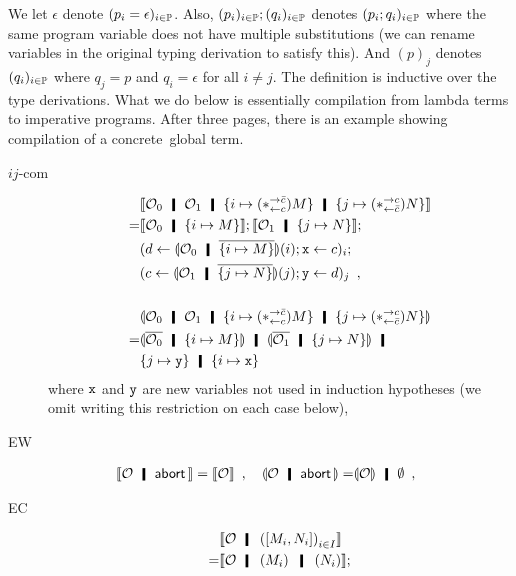 We let $\epsilon$ denote $(p_i = \epsilon)_{i\in\mathbb{P}}$.
Also, $(p_i)_{i\in\mathbb{P}}; (q_i)_{i\in\mathbb{P}}$ denotes
$(p_i; q_i)_{i\in\mathbb{P}}$ where the
same program variable does not have multiple substitutions
(we can rename variables in the original typing derivation to satisfy
this).
And $(p)_j$ denotes $(q_i)_{i\in\mathbb{P}}$ where $q_j = p$ and $q_i =
\epsilon$ for all $i\neq j$.
The definition is inductive over the type derivations. What we do below is
essentially compilation from lambda terms to imperative programs.
After three pages, there is an example showing compilation of a concrete
\lgd\,global term.
\begin{description}
 \item[$ij$-com]
      \begin{align*}
       &\semo{\hypert_0\hmid\hypert_1\hmid \imapsto{(\comodL) M}\hmid
       \jmapsto{(\comodR) N}} \\
       =& \semo{\hypert_0\hmid \imapsto{M}};
       \semo{\hypert_1\hmid \jmapsto{N}};\\
       &(d\leftarrow \semoi{\hypert_0\hmid\overline{\imapsto{M}}}(i); \p
       x\leftarrow c)_i; \\
       &(c\leftarrow \semoi{\hypert_1\hmid\overline{\jmapsto{N}}}(j); \p
       y\leftarrow d)_j\enspace,\\ \\
       &\semoi{\hypert_0\hmid\hypert_1\hmid \imapsto{(\comodL) M}\hmid
       \jmapsto{(\comodR) N}} \\=&
       \semoi{\overline{\hypert_0}\hmid \imapsto{M}} \hmid
       \semoi{\overline{\hypert_1}\hmid \jmapsto{N}}
       \hmid\\& \{j\mapsto\p y\}\hmid \{i\mapsto \p x\}
      \end{align*}
      where $\texttt{x}$ and $\texttt{y}$ are new variables not used in induction
      hypotheses (we omit writing this restriction on each case below),
 \item[EW] \begin{align*}
 \semo{\hypert\hmid \abort}=\semo{\hypert}\enspace,\quad
 \semoi{\hypert\hmid\abort}=&\semoi{\hypert}\hmid \emptyset\enspace,\quad
	   \end{align*}
 \item[EC] 
      \begin{align*}
         &\semo{ \hypert \hmid \left(\cotuple{M_i,N_i}\right)_{i\in I}
       } \\
       =& \semo{\hypert\hmid \left(M_i\right) \hmid
       \left(N_i\right)}; \\

\end{align*}
\end{description}

